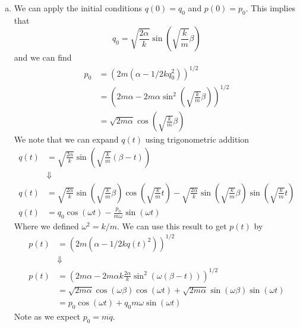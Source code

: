 \documentclass[11pt]{article}
\numberwithin{equation}{section}
\begin{document}
\begin{enumerate}[(a)]
\item We can apply the initial conditions $q(0) = q_0$ and $p(0) = p_0$. This implies that
$$q_0 = \sqrt{\frac{2\alpha}{k}}\sin\left(\sqrt{\frac{k}{m}}\beta\right)$$
and we can find 
\begin{align*}
p_0 &= \left(2m(\alpha-1/2kq_0^2)\right)^{1/2}\\
&= \left(2m\alpha-2m\alpha\sin^2\left(\sqrt{\frac{k}{m}}\beta\right)\right)^{1/2}\\
&= \sqrt{2m\alpha}\cos\left(\sqrt{\frac{k}{m}}\beta\right)
\end{align*}
We note that we can expand $q(t)$ using trigonometric addition
\begin{align*}
q(t) &= \sqrt{\frac{2\alpha}{k}}\sin\left(\sqrt{\frac{k}{m}}(\beta-t)\right)\\
&\Downarrow\\
q(t) &= \sqrt{\frac{2\alpha}{k}}\sin\left(\sqrt{\frac{k}{m}}\beta\right)\cos\left(\sqrt{\frac{k}{m}}t\right) - \sqrt{\frac{2\alpha}{k}}\sin\left(\sqrt{\frac{k}{m}}\beta\right)\sin\left(\sqrt{\frac{k}{m}}t\right)\\
q(t) &= q_0\cos\left(\omega{t}\right) - \frac{p_0}{m\omega}\sin\left(\omega{t}\right)
\end{align*}
Where we defined $\omega^2=k/m$. We can use this result to get $p(t)$ by
\begin{align*}
p(t) &= \left(2m(\alpha-1/2kq(t)^2)\right)^{1/2}\\
&\Downarrow\\
p(t) &= \left(2m\alpha-2m\alpha{k}\frac{2\alpha}{k}\sin^2(\omega(\beta-t))\right)^{1/2}\\
&= \sqrt{2m\alpha}\cos(\omega\beta)\cos(\omega{t}) + \sqrt{2m\alpha}\sin(\omega\beta)\sin(\omega{t})\\
&= p_0\cos(\omega{t}) + q_0m\omega\sin(\omega{t})
\end{align*}
Note as we expect $p_0 = m\dot{q}$.
\end{enumerate}

\pagebreak
\end{document}
